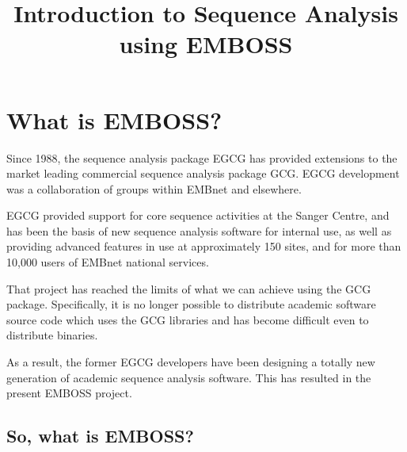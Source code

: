 \documentclass[12pt]{report}
\begin{document}
\newcommand{\type}[1]{{\bfseries #1}}
\newcommand{\unix}[1]{{\noindent\ttfamily unix \% #1}}
\newcommand{\screendump}[1]{{\noindent\ttfamily #1}}
\newcommand{\scr}[1]{{\screendump{#1}}}
\newcommand{\file}[1]{{{\tt #1}}}
\newcommand{\prog}[1]{{{\tt #1}}}
\newcommand{\hsp}{{\hspace{0.5cm}}}
\newcommand{\first}[1]{{\htmladdnormallink{\scr{#1}}{http://www.uk.embnet.org/Software/EMBOSS/Apps/#1.html}}}
\begin{latexonly}
\end{latexonly}

\title{Introduction to Sequence Analysis using EMBOSS}
\date{}

\maketitle

\chapter{What is EMBOSS?}
\label{chap:what_is}
Since 1988, the sequence analysis package EGCG has provided extensions
to the market leading commercial sequence analysis package GCG. EGCG
development was a collaboration of groups within EMBnet and elsewhere.

EGCG provided support for core sequence activities at the Sanger
Centre, and has been the basis of new sequence analysis software for
internal use, as well as providing advanced features in use at
approximately 150 sites, and for more than 10,000 users of EMBnet
national services.

That project has reached the limits of what we can achieve using the
GCG package. Specifically, it is no longer possible to distribute
academic software source code which uses the GCG libraries and has
become difficult even to distribute binaries.

As a result, the former EGCG developers have been designing a totally
new generation of academic sequence analysis software. This has
resulted in the present EMBOSS project.

\section{So, what is EMBOSS?}
\end{document}
